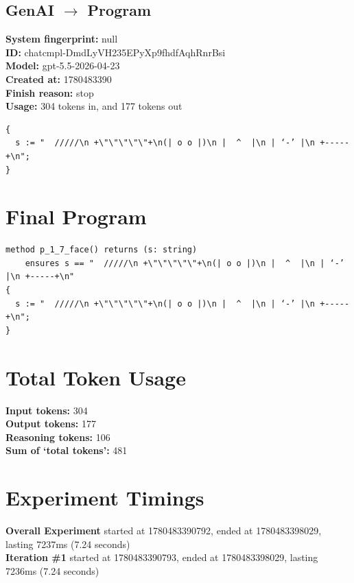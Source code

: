 \documentclass{article}
\begin{document}
\subsection*{GenAI $\rightarrow$ Program}
\textbf{System fingerprint: }null
\\\textbf{ID: }chatcmpl-DmdLyVH235EPyXp9fhdfAqhRnrBsi
\\\textbf{Model: }gpt-5.5-2026-04-23
\\\textbf{Created at: }1780483390
\\\textbf{Finish reason: }stop
\\\textbf{Usage: }304 tokens in, and 177 tokens out
\begin{lstlisting}
{
  s := "  /////\n +\"\"\"\"\"+\n(| o o |)\n |  ^  |\n | ‘-’ |\n +-----+\n";
}
\end{lstlisting}
\section*{Final Program}
\begin{lstlisting}
method p_1_7_face() returns (s: string)
	ensures s == "  /////\n +\"\"\"\"\"+\n(| o o |)\n |  ^  |\n | ‘-’ |\n +-----+\n"
{
  s := "  /////\n +\"\"\"\"\"+\n(| o o |)\n |  ^  |\n | ‘-’ |\n +-----+\n";
}
\end{lstlisting}
\section*{Total Token Usage}
\textbf{Input tokens: }304
\\\textbf{Output tokens: }177
\\\textbf{Reasoning tokens: }106
\\\textbf{Sum of `total tokens': }481
\section*{Experiment Timings}
\textbf{Overall Experiment} started at 1780483390792, ended at 1780483398029, lasting 7237ms (7.24 seconds)
\\\textbf{Iteration \#1} started at 1780483390793, ended at 1780483398029, lasting 7236ms (7.24 seconds)
\end{document}
